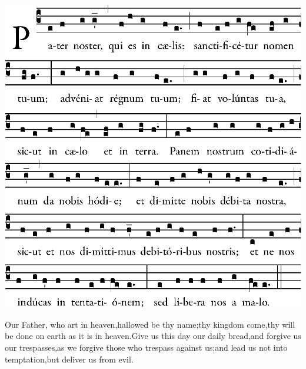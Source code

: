 \begin{center}
\includegraphics[width=.9\textwidth]{src/ordinario/pater.eps}
\end{center}

\be Our Father, who art in heaven,\redast hallowed be thy name;\redast thy kingdom come,\redast thy will be done on earth as it is in heaven.\redast Give us this day our daily bread,\redast and forgive us our trespasses,\redast as we forgive those who trespass against us;\redast and lead us not into temptation,\redast but deliver us from evil.